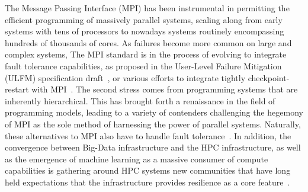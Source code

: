 \documentclass[sigconf]{acmart}
\newcommand{\ulfm}[0]{\textsc{ULFM}\xspace}
\newcommand{\mpi}[0]{\textsc{MPI}\xspace}
\begin{document}
The Message Passing Interface (MPI) has been instrumental in 
permitting the efficient programming of massively parallel systems, scaling 
along from early systems with tens of processors to nowadays systems routinely 
encompassing hundreds of thousands of cores. As failures become more 
common on large and complex systems, The \mpi standard is in the process of 
evolving to integrate fault tolerance capabilities, as proposed in the 
User-Level Failure Mitigation (\ulfm) specification draft~\cite{Bland2013}, or 
various efforts to integrate tightly checkpoint-restart with \mpi~\cite{reinit18}.
The second stress comes from programming systems that are inherently
hierarchical. This has brought forth a renaissance in the field of
programming models, leading to a variety of contenders challenging the
hegemony of \mpi as the sole method of harnessing the power of parallel systems.
Naturally, these alternatives to \mpi also have to handle fault tolerance~\cite{7161563, doi:10.1177/1094342016669416, shmem-ft15, 10.1007/978-3-319-50995-2_5, X10-ft16}. 
In addition, the convergence
between Big-Data infrastructure and the HPC infrastructure, as well as
the emergence of machine learning as a massive consumer of compute
capabilities is gathering around HPC systems new communities that 
have long held expectations that the infrastructure provides resilience as a core feature~\cite{hadoop-ft}.
\end{document}
